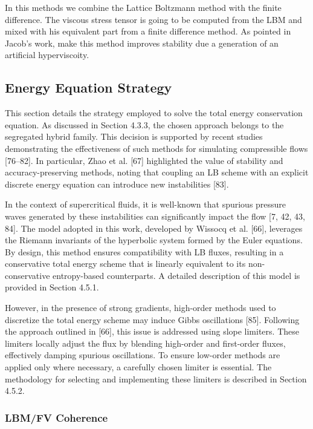 In this methods we combine the Lattice Boltzmann method with the finite
difference. The viscous stress tensor is going to be computed from the LBM and
mixed with his equivalent part from a finite difference method. As pointed in
Jacob's work, make this method improves stability due a generation of an
artificial hyperviscoity.

\subsection{Energy Equation Strategy}

This section details the strategy employed to solve the total energy
conservation equation. As discussed in Section 4.3.3, the chosen approach
belongs to the segregated hybrid family. This decision is supported by recent
studies demonstrating the effectiveness of such methods for simulating
compressible flows [76–82]. In particular, Zhao et al. [67] highlighted the
value of stability and accuracy-preserving methods, noting that coupling an LB
scheme with an explicit discrete energy equation can introduce new instabilities
[83].

In the context of supercritical fluids, it is well-known that spurious pressure
waves generated by these instabilities can significantly impact the flow [7, 42,
43, 84]. The model adopted in this work, developed by Wissocq et al. [66],
leverages the Riemann invariants of the hyperbolic system formed by the Euler
equations. By design, this method ensures compatibility with LB fluxes,
resulting in a conservative total energy scheme that is linearly equivalent to
its non-conservative entropy-based counterparts. A detailed description of this
model is provided in Section 4.5.1.

However, in the presence of strong gradients, high-order methods used to
discretize the total energy scheme may induce Gibbs oscillations [85]. Following
the approach outlined in [66], this issue is addressed using slope limiters.
These limiters locally adjust the flux by blending high-order and first-order
fluxes, effectively damping spurious oscillations. To ensure low-order methods
are applied only where necessary, a carefully chosen limiter is essential. The
methodology for selecting and implementing these limiters is described in
Section 4.5.2.

\subsubsection{LBM/FV Coherence}

